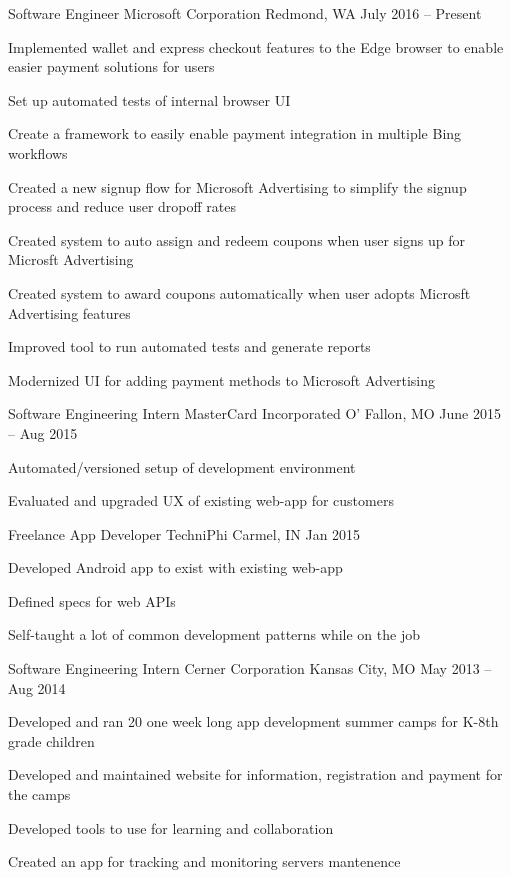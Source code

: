 \documentclass[]{awesome-cv}
\begin{document}
\begin{cventries}
	\cventry
	{Software Engineer}
	{Microsoft Corporation}
	{Redmond, WA}
	{July 2016 – Present}
	{\begin{cvitems}
		\item {Implemented wallet and express checkout features to the Edge browser to enable easier payment solutions for users}
		\item {Set up automated tests of internal browser UI}
		\item {Create a framework to easily enable payment integration in multiple Bing workflows}
		\item {Created a new signup flow for Microsoft Advertising to simplify the signup process and reduce user dropoff rates}
		\item {Created system to auto assign and redeem coupons when user signs up for Microsft Advertising}
		\item {Created system to award coupons automatically when user adopts Microsft Advertising features}
		\item {Improved tool to run automated tests and generate reports}
		\item {Modernized UI for adding payment methods to Microsoft Advertising}
	\end{cvitems}}
	\cventry
	{Software Engineering Intern}
	{MasterCard Incorporated}
	{O' Fallon, MO}
	{June 2015 – Aug 2015}
	{\begin{cvitems}
		\item {Automated/versioned setup of development environment}
		\item {Evaluated and upgraded UX of existing web-app for customers}
		\end{cvitems}}
	\cventry
	{Freelance App Developer}
	{TechniPhi}
	{Carmel, IN}
	{Jan 2015}
	{\begin{cvitems}
		\item {Developed Android app to exist with existing web-app}
		\item {Defined specs for web APIs}
		\item {Self-taught a lot of common development patterns while on the job}
		\end{cvitems}}
	\cventry
	{Software Engineering Intern}
	{Cerner Corporation}
	{Kansas City, MO}
	{May 2013 – Aug 2014}
	{\begin{cvitems}
		\item {Developed and ran 20 one week long app development summer camps for K-8th grade children}
		\item {Developed and maintained website for information, registration and payment for the camps}
		\item {Developed tools to use for learning and collaboration}
		\item {Created an app for tracking and monitoring servers mantenence}
		\end{cvitems}}
\end{cventries}
\end{document}
